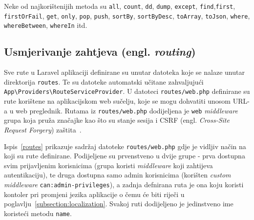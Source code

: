 Neke od najkorištenijih metoda su \texttt{all}, \texttt{count}, \texttt{dd}, \texttt{dump}, \texttt{except}, \texttt{find},\texttt{first}, \texttt{firstOrFail}, \texttt{get}, \texttt{only}, \texttt{pop}, \texttt{push}, \texttt{sortBy}, \texttt{sortByDesc}, \texttt{toArray}, \texttt{toJson}, \texttt{where}, \texttt{whereBetween}, \texttt{whereIn} itd.~\cite{collections}

\subsection{Usmjerivanje zahtjeva (engl. \textit{routing})}
Sve rute u Laravel aplikaciji definirane su unutar datoteka koje se nalaze unutar direktorija \texttt{routes}. Te su datoteke automatski učitane zahvaljujući \\ \texttt{App\textbackslash Providers\textbackslash RouteServiceProvider}. U datoteci \texttt{routes/web.php} definirane su rute korištene na aplikacijskom web sučelju, koje se mogu dohvatiti unosom URL-a u web preglednik. Rutama iz \texttt{routes/web.php} dodijeljena je \texttt{web} \textit{middleware} grupa koja pruža značajke kao što su stanje sesija i CSRF (engl. \textit{Cross-Site Request Forgery}) zaštita~\cite{routing}.

Ispis~\ref{routes} prikazuje sadržaj datoteke \texttt{routes/web.php} gdje je vidljiv način na koji su rute definirane. Podijeljene su prvenstveno u dvije grupe - prva dostupna svim prijavljenim korisnicima (grupa koristi \textit{middleware} koji zahtijeva autentikaciju), te druga dostupna samo admin korisnicima (korišten \textit{custom} \textit{middleware} \texttt{can:admin-privileges}), a zadnja defnirana ruta je ona koju koristi kontoler pri promjeni jezika aplikacije o čemu će biti riječi u poglavlju~\ref{subsection:localization}. Svakoj ruti dodijeljeno je jedinstveno ime koristeći metodu \texttt{name}.

